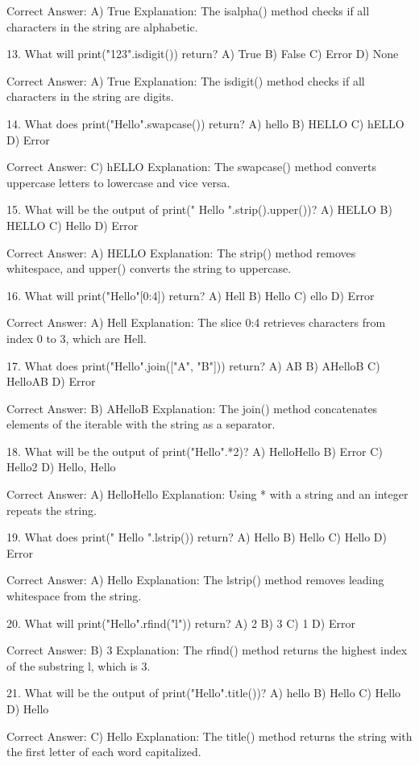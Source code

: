 Correct Answer: A) True
Explanation: The isalpha() method checks if all characters in the string are alphabetic.

13. What will print("123".isdigit()) return?
A) True
B) False
C) Error
D) None

Correct Answer: A) True
Explanation: The isdigit() method checks if all characters in the string are digits.

14. What does print("Hello".swapcase()) return?
A) hello
B) HELLO
C) hELLO
D) Error

Correct Answer: C) hELLO
Explanation: The swapcase() method converts uppercase letters to lowercase and vice versa.

15. What will be the output of print(" Hello ".strip().upper())?
A) HELLO
B) HELLO
C) Hello
D) Error

Correct Answer: A) HELLO
Explanation: The strip() method removes whitespace, and upper() converts the string to uppercase.

16. What will print("Hello"[0:4]) return?
A) Hell
B) Hello
C) ello
D) Error

Correct Answer: A) Hell
Explanation: The slice 0:4 retrieves characters from index 0 to 3, which are Hell.

17. What does print("Hello".join(["A", "B"])) return?
A) AB
B) AHelloB
C) HelloAB
D) Error

Correct Answer: B) AHelloB
Explanation: The join() method concatenates elements of the iterable with the string as a separator.

18. What will be the output of print("Hello".*2)?
A) HelloHello
B) Error
C) Hello2
D) Hello, Hello

Correct Answer: A) HelloHello
Explanation: Using * with a string and an integer repeats the string.

19. What does print(" Hello ".lstrip()) return?
A) Hello
B) Hello
C) Hello
D) Error

Correct Answer: A) Hello
Explanation: The lstrip() method removes leading whitespace from the string.

20. What will print("Hello".rfind("l")) return?
A) 2
B) 3
C) 1
D) Error

Correct Answer: B) 3
Explanation: The rfind() method returns the highest index of the substring l, which is 3.

21. What will be the output of print("Hello".title())?
A) hello
B) Hello
C) Hello
D) Hello

Correct Answer: C) Hello
Explanation: The title() method returns the string with the first letter of each word capitalized.

